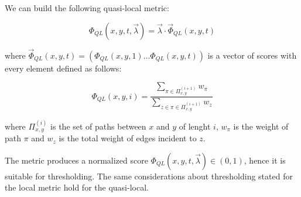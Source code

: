 We can build the following quasi-local metric:

\begin{equation}
\label{eqn:detection-quasi-local-1}
\Phi_{QL}(x,y,t,\vec{\lambda})=\vec{\lambda}\cdot\vec{\Phi}_{QL}(x,y,t)
\end{equation}

where $\vec{\Phi}_{QL}(x,y,t)=(\Phi_{QL}(x,y,1)\ldots\Phi_{QL}(x,y,t))$ is a vector of scores with every element defined as follows:


%

\begin{equation}
\label{eqn:detection-quasi-local-3}
\Phi_{QL}(x,y,i)=
\frac{\sum\limits_{\pi\in\Pi_{x,y}^{(i+1)}}w_{\pi}}
{\sum\limits_{z\in\pi\in\Pi_{x,y}^{(i+1)}}w_{z}}
\end{equation}

where $\Pi_{x,y}^{(i)}$ is the set of paths between $x$ and $y$ of lenght $i$,
$w_{\pi}$ is the weight of path $\pi$ and
$w_{z}$ is the total weight of edges incident to $z$.

The metric produces a normalized score $\Phi_{QL}(x,y,t,\vec{\lambda})\in(0,1)$, hence it is suitable for thresholding. The same considerations about thresholding stated for the local metric hold for the quasi-local.


